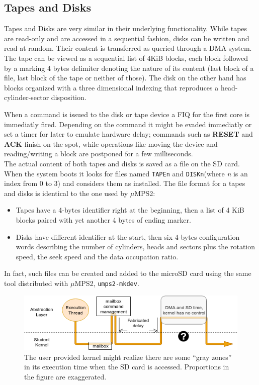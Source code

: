 \documentclass[12pt,a4paper,openright,twoside]{report}
\begin{document}
\subsection{Tapes and Disks}
Tapes and Disks are very similar in their underlying functionality. While tapes 
are read-only and are accessed in a sequential fashion, disks can be written and
read at random. Their content is transferred as queried through a DMA system.\\
The tape can be viewed as a sequential list of 4KiB blocks, each block followed
by a marking 4 bytes delimiter denoting the nature of its content (last block of 
a file, last block of the tape or neither of those).
The disk on the other hand has blocks organized with a three dimensional indexing
that reproduces a head-cylinder-sector disposition.

When a command is issued to the disk or tape device a FIQ for the first core is immediatly
fired. Depending on the command it might be evaded immediatly or set a timer for
later to emulate hardware delay; commands such as \textbf{RESET} and \textbf{ACK}
finish on the spot, while operations like moving the device and reading/writing
 a block are postponed for a few milliseconds.\\

The actual content of both tapes and disks is saved as a file on the SD card. When the system 
boots it looks for files named {\tt TAPEn} and {\tt DISKn}(where \textit{n}
 is an index from 0 to 3) and considers them as installed. 
The file format for a tapes and disks is identical to the one used by $\mu$MPS2: 
\begin{itemize}
    \item Tapes have a 4-bytes identifier right at the beginning, then 
        a list of 4 KiB blocks paired with yet another 4 bytes of ending marker.
    \item Disks have different identifier at the start, then six 4-bytes configuration
        words describing the number of cylinders, heads and sectors plus the rotation
        speed, the seek speed and the data occupation ratio.
\end{itemize}
In fact, such files can be created and added to the microSD card using the same tool
distributed with $\mu$MPS2, {\tt umps2-mkdev}.

 \begin{figure}[t]
    \begin{center}
 \includegraphics[scale=0.65]{images/tesi13.png}
 \caption[HAL Execution Thread]{The user provided kernel might realize there are some
 ``gray zones'' in its execution time when the SD card is accessed. Proportions
 in the figure are exaggerated.}
 \label{fig:executionthread}
    \end{center}
 \end{figure}
\end{document}
